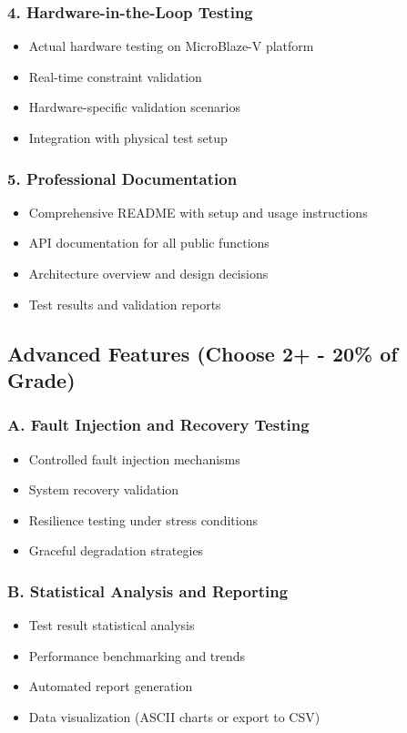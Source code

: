 \documentclass[11pt,a4paper]{article}
\begin{document}
\subsubsection{4. Hardware-in-the-Loop Testing}
\begin{itemize}
    \item Actual hardware testing on MicroBlaze-V platform
    \item Real-time constraint validation
    \item Hardware-specific validation scenarios
    \item Integration with physical test setup
\end{itemize}

\subsubsection{5. Professional Documentation}
\begin{itemize}
    \item Comprehensive README with setup and usage instructions
    \item API documentation for all public functions
    \item Architecture overview and design decisions
    \item Test results and validation reports
\end{itemize}

\subsection{Advanced Features (Choose 2+ - 20\% of Grade)}

\subsubsection{A. Fault Injection and Recovery Testing}
\begin{itemize}
    \item Controlled fault injection mechanisms
    \item System recovery validation
    \item Resilience testing under stress conditions
    \item Graceful degradation strategies
\end{itemize}

\subsubsection{B. Statistical Analysis and Reporting}
\begin{itemize}
    \item Test result statistical analysis
    \item Performance benchmarking and trends
    \item Automated report generation
    \item Data visualization (ASCII charts or export to CSV)
\end{itemize}
\end{document}

